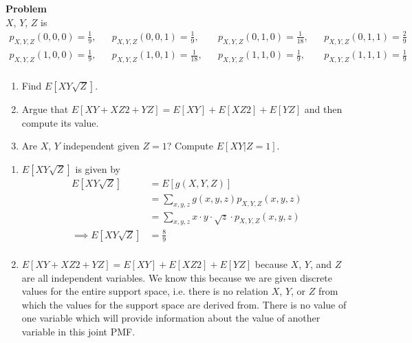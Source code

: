 \documentclass[12pt]{article}
\newenvironment{Ex}{\textbf{Problem}\vspace{.75em}\\}{}
\begin{document}
\begin{enumerate}
\begin{Ex}
    $X$, $Y$, $Z$ is
    \begin{equation*}
      \label{eq:4-question}
      \begin{aligned}
        p_{X,Y,Z}(0,0,0) = \frac{1}{9}, && p_{X,Y,Z}(0,0,1) =
        \frac{1}{9}, && p_{X,Y,Z}(0,1,0) = \frac{1}{18}, &&
        p_{X,Y,Z}(0,1,1) = \frac{2}{9} \\
        p_{X,Y,Z}(1,0,0) = \frac{1}{9}, && p_{X,Y,Z}(1,0,1) =
        \frac{1}{18}, && p_{X,Y,Z}(1,1,0) = \frac{1}{9}, &&
        p_{X,Y,Z}(1,1,1) = \frac{1}{9} \\
      \end{aligned}
    \end{equation*}
    \begin{enumerate}
    \item Find $E[XY\sqrt{Z}]$.
    \item Argue that $E[XY +XZ2 +YZ] = E[XY]+E[XZ2]+E[YZ]$ and then
      compute its value.
    \item Are $X$, $Y$ independent given $Z=1$? Compute $E[XY|Z = 1]$.
    \end{enumerate}
    \begin{solution} \hfill
      \begin{enumerate}
      \item $E[XY\sqrt{Z}]$ is given by
        \begin{equation}
          \label{eq:4a-sol}
          \begin{aligned}
            E[XY\sqrt{Z}] &= E[g(X,Y,Z)] \\
            &= \sum_{x,y,z} g(x,y,z)p_{X,Y,Z}(x,y,z) \\
            &= \sum_{x,y,z} x \cdot y \cdot \sqrt{z} \cdot
            p_{X,Y,Z}(x,y,z) \\
            \implies E[XY\sqrt{Z}] &= \frac{8}{9} \\
          \end{aligned}
        \end{equation}
      \item $E[XY +XZ2 +YZ] = E[XY]+E[XZ2]+E[YZ]$ because $X$, $Y$,
        and $Z$ are all independent variables. We know this because we
        are given discrete values for the entire support space,
        i.e. there is no relation $X$, $Y$, or $Z$ from which the
        values for the support space are derived from. There is no
        value of one variable which will provide information about the
        value of another variable in this joint PMF.
        \begin{equation}

\end{equation}
\end{enumerate}
\end{solution}
\end{Ex}
\end{enumerate}
\end{document}
